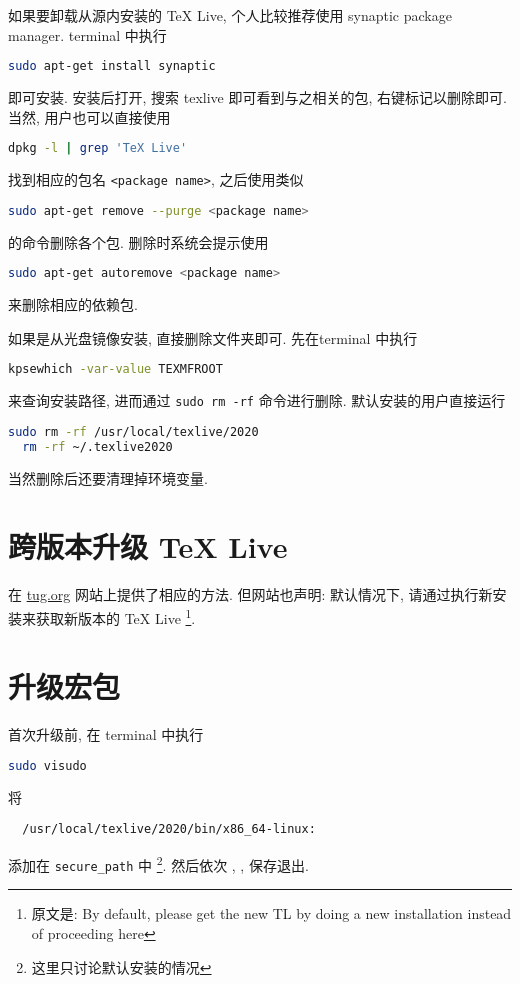 如果要卸载从源内安装的 \TeX{} Live, 个人比较推荐使用 synaptic package manager.
\textsf{terminal} 中执行
\begin{lstlisting}[language = bash]
  sudo apt-get install synaptic
\end{lstlisting}
即可安装.
安装后打开, 搜索 \textsf{texlive} 即可看到与之相关的包, 右键标记以删除即可.
当然, 用户也可以直接使用
\begin{lstlisting}[language = bash]
  dpkg -l | grep 'TeX Live'
\end{lstlisting}
找到相应的包名 \texttt{<package name>}, 之后使用类似
\begin{lstlisting}[language = bash]
  sudo apt-get remove --purge <package name>
\end{lstlisting}
的命令删除各个包.
删除时系统会提示使用
\begin{lstlisting}[language = bash]
  sudo apt-get autoremove <package name>
\end{lstlisting}
来删除相应的依赖包.

如果是从光盘镜像安装,
直接删除文件夹即可.
先在\textsf{terminal} 中执行
\begin{lstlisting}[language = bash]
  kpsewhich -var-value TEXMFROOT
\end{lstlisting}
来查询安装路径,
进而通过 \texttt{sudo rm -rf} 命令进行删除.
默认安装的用户直接运行
\begin{lstlisting}[language = bash]
  sudo rm -rf /usr/local/texlive/2020
  rm -rf ~/.texlive2020
\end{lstlisting}
当然删除后还要清理掉环境变量.

\section{跨版本升级 \TeX{} Live}\label{sec:ubuntu:version}

在 \href{https://www.tug.org/texlive/upgrade.html}{tug.org}
网站上提供了相应的方法.
但网站也声明:
默认情况下,
请通过执行新安装来获取新版本的 \TeX{} Live%
\footnote{原文是: By default,
please get the new TL by doing a new installation instead of proceeding here}.

\section{升级宏包}\label{sec:ubuntu:update}

首次升级前,
在 \textsf{terminal} 中执行
\begin{lstlisting}[language = bash]
  sudo visudo
\end{lstlisting}
将
\begin{lstlisting}
  /usr/local/texlive/2020/bin/x86_64-linux:
\end{lstlisting}
添加在 \texttt{secure\_path} 中%
\footnote{这里只讨论默认安装的情况}.
然后依次 , , \keys{\enter} 保存退出.

